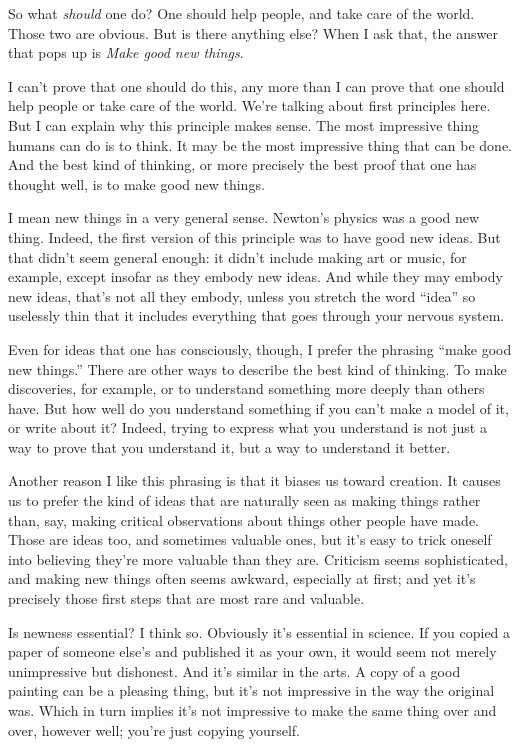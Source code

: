 \documentclass[12pt]{book}
\begin{document}
So what \emph{should} one do? One should help people, and take care of
the world. Those two are obvious. But is there anything else? When I ask
that, the answer that pops up is \emph{Make good new things}.

I can't prove that one should do this, any more than I can prove that
one should help people or take care of the world. We're talking about
first principles here. But I can explain why this principle makes sense.
The most impressive thing humans can do is to think. It may be the most
impressive thing that can be done. And the best kind of thinking, or
more precisely the best proof that one has thought well, is to make good
new things.

I mean new things in a very general sense. Newton's physics was a good
new thing. Indeed, the first version of this principle was to have good
new ideas. But that didn't seem general enough: it didn't include making
art or music, for example, except insofar as they embody new ideas. And
while they may embody new ideas, that's not all they embody, unless you
stretch the word ``idea'' so uselessly thin that it includes everything
that goes through your nervous system.

Even for ideas that one has consciously, though, I prefer the phrasing
``make good new things.'' There are other ways to describe the best kind
of thinking. To make discoveries, for example, or to understand
something more deeply than others have. But how well do you understand
something if you can't make a model of it, or write about it? Indeed,
trying to express what you understand is not just a way to prove that
you understand it, but a way to understand it better.

Another reason I like this phrasing is that it biases us toward
creation. It causes us to prefer the kind of ideas that are naturally
seen as making things rather than, say, making critical observations
about things other people have made. Those are ideas too, and sometimes
valuable ones, but it's easy to trick oneself into believing they're
more valuable than they are. Criticism seems sophisticated, and making
new things often seems awkward, especially at first; and yet it's
precisely those first steps that are most rare and valuable.

Is newness essential? I think so. Obviously it's essential in science.
If you copied a paper of someone else's and published it as your own, it
would seem not merely unimpressive but dishonest. And it's similar in
the arts. A copy of a good painting can be a pleasing thing, but it's
not impressive in the way the original was. Which in turn implies it's
not impressive to make the same thing over and over, however well;
you're just copying yourself.
\end{document}
